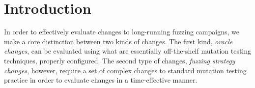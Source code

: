 \section{Introduction}

In order to effectively evaluate changes to long-running fuzzing campaigns, we make a core distinction between two kinds of changes.  The first kind, \emph{oracle changes}, can be evaluated using what are essentially off-the-shelf mutation testing techniques, properly configured.  The second type of changes, \emph{fuzzing strategy changes}, however, require a set of complex changes to standard mutation testing practice in order to evaluate changes in a time-effective manner.

